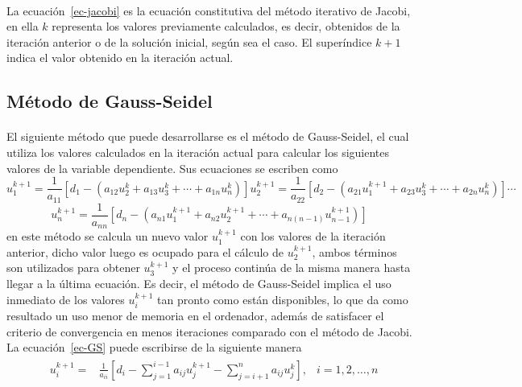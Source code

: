 \documentclass[letterpaper, openright, 12pt]{book}
\begin{document}
    \paragraph*{}
        La ecuación~\ref{ec-jacobi} es la ecuación constitutiva del método
        iterativo de Jacobi, en ella $k$ representa los valores previamente
        calculados, es decir, obtenidos de la iteración anterior o de la
        solución inicial, según sea el caso. El superíndice $k+1$ indica el
        valor obtenido en la iteración actual.
    \subsection{Método de Gauss-Seidel}
    \paragraph*{}
    El siguiente método que puede desarrollarse es el método de Gauss-Seidel,
    el cual utiliza los valores calculados en la iteración actual para
    calcular los siguientes valores de la variable dependiente. Sus
    ecuaciones se escriben como
    \begin{subequations}
        \begin{equation*}
            u_{1}^{k+1} = \frac{1}{a_{11}} \left[ d_{1} - \left( a_{12}u_{2}^{k} + a_{13}u_{3}^{k} + \dotsb + a_{1n}u_{n}^k \right) \right]
        \end{equation*}
        \begin{equation*}
            u_{2}^{k+1} = \frac{1}{a_{22}} \left[ d_{2} - \left( a_{21}u_{1}^{k+1} + a_{23}u_{3}^{k} + \dotsb + a_{2n}u_{n}^{k} \right) \right]
        \end{equation*}
        \begin{equation*}
            \dotsb
        \end{equation*}
    \end{subequations}
    \begin{equation}
        u_{n}^{k+1} = \frac{1}{a_{nn}} \left[ d_{n} - \left( a_{n1}u_{1}^{k+1} + a_{n2}u_{2}^{k+1} + \dotsb + a_{n\left( n-1 \right)}u_{n-1}^{k+1} \right) \right]
        \label{ec-GS}
    \end{equation}
    en este método se calcula un nuevo valor $u_{1}^{k+1}$ con los valores
    de la iteración anterior, dicho valor luego es ocupado para
    el cálculo de $u_{2}^{k+1}$, ambos términos son utilizados para obtener
    $u_{3}^{k+1}$ y el proceso continúa de la misma manera hasta llegar a
    la última ecuación. Es decir, el método de Gauss-Seidel implica el uso
    inmediato de los valores $u_{i}^{k+1}$ tan pronto como están disponibles,
    lo que da como resultado un uso menor de memoria en el ordenador, además
    de satisfacer el criterio de convergencia en menos iteraciones comparado
    con el método de Jacobi. La ecuación~\ref{ec-GS} puede escribirse de la
    siguiente manera
    \begin{align}
        &\begin{aligned}
            u_{i}^{k+1} =& \frac{1}{a_{ii}} \left[ d_{i} - \sum_{j=1}^{i-1} a_{ij}u_{j}^{k+1}  - \sum_{j = i + 1}^{n} a_{ij}u_{j}^{k} \right], &i = 1, 2, \dotsc, n
        \end{aligned}
        \label{ec-GS-2}
    \end{align}
\end{document}
